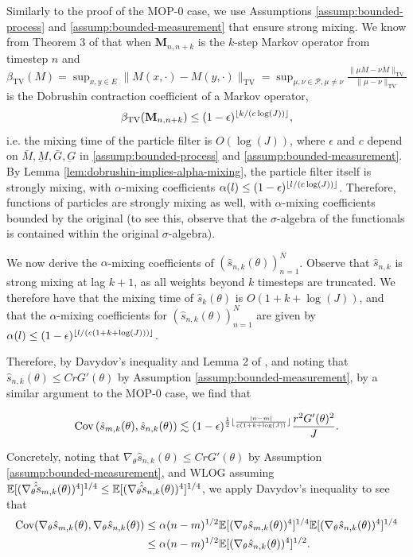 \documentclass{article}
\begin{document}
Similarly to the proof of the MOP-$0$ case, we use Assumptions \ref{assump:bounded-process} and \ref{assump:bounded-measurement} that ensure strong mixing. We know from Theorem 3 of \cite{karjalainen2023} that when $\textbf{M}_{n,n+k}$ is the $k$-step Markov operator from timestep $n$ and $\beta_{\text{TV}}(M) = \sup _{x, y \in E}\|M(x, \cdot)-M(y, \cdot)\|_{\mathrm{TV}}=\sup _{\mu, \nu \in \mathcal{P}, \mu \neq \nu} \frac{\|\mu M-\nu M\|_{\mathrm{TV}}}{\|\mu-\nu\|_{\mathrm{TV}}}$ is the Dobrushin contraction coefficient of a Markov operator, 
$$\beta_{\text{TV}}(\textbf{M}_{n,n+k}) \leq (1-\epsilon)^{\lfloor k/(c\log(J)) \rfloor},$$
i.e. the mixing time of the particle filter is $O(\log(J))$, where $\epsilon$ and $c$ depend on $\bar{M}, \underbar{M}, \bar{G}, \underbar{G}$ in \ref{assump:bounded-process} and \ref{assump:bounded-measurement}. By Lemma \ref{lem:dobrushin-implies-alpha-mixing}, the particle filter itself is strongly mixing, with $\alpha$-mixing coefficients $\alpha(l) \leq (1-\epsilon)^{\lfloor l/(c\log(J)) \rfloor}$. Therefore, functions of particles are strongly mixing as well, with $\alpha$-mixing coefficients bounded by the original (to see this, observe that the $\sigma$-algebra of the functionals is contained within the original $\sigma$-algebra).

We now derive the $\alpha$-mixing coefficients of $(\hat s_{n,k}(\theta))_{n=1}^N$. Observe that $\hat s_{n,k}$ is strong mixing at lag $k+1$, as all weights beyond $k$ timesteps are truncated. We therefore have that the mixing time of $\hat s_k(\theta)$ is $O(1+k+\log(J))$, and that the $\alpha$-mixing coefficients for $(\hat s_{n,k}(\theta))_{n=1}^N$ are given by $\alpha(l) \leq (1-\epsilon)^{\lfloor l/(c(1+k+\log(J))) \rfloor}$.

Therefore, by Davydov's inequality and Lemma 2 of \cite{karjalainen2023}, and noting that $\hat s_{n,k}(\theta) \leq CrG'(\theta)$ by Assumption \ref{assump:bounded-measurement}, by a similar argument to the MOP-0 case, we find that 

$$\text{Cov}\left(\hat s_{m,k}(\theta), \hat s_{n,k}(\theta)\right) \lesssim (1-\epsilon)^{\frac{1}{2}\lfloor \frac{|n-m|}{c(1+k+\log(J))} \rfloor}\frac{r^2G'(\theta)^2}{J}.$$

Concretely, noting that $\nabla_\theta\hat s_{n,k}(\theta)\leq CrG'(\theta)$ by Assumption \ref{assump:bounded-measurement}, and WLOG assuming $\mathbb{E}[(\nabla_\theta\hat\hat s_{m,k}(\theta))^4]^{1/4}\leq\mathbb{E}[(\nabla_\theta\hat\hat s_{n,k}(\theta))^4]^{1/4}$, we apply Davydov's inequality to see that
\begin{align*}
    \text{Cov}(\nabla_\theta\hat s_{m,k}(\theta), \nabla_\theta\hat s_{n,k}(\theta)) 
    &\leq \alpha(n-m)^{1/2}\mathbb{E}[(\nabla_\theta\hat s_{m,k}(\theta))^4]^{1/4}\mathbb{E}[(\nabla_\theta\hat s_{n,k}(\theta))^4]^{1/4}\\
    &\leq \alpha(n-m)^{1/2}\mathbb{E}[(\nabla_\theta\hat s_{n,k}(\theta))^4]^{1/2}.
\end{align*}
\end{document}
